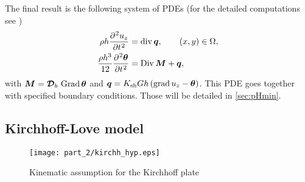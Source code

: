 The final result is the following system of PDEs (for the detailed computations see \cite[Chapter 10]{reddy2006theory})
\begin{equation}\label{eq:classMin}
\begin{aligned}
\rho h \diffp[2]{u_z}{t} &= \div \bm{q}, \qquad (x,y) \in \Omega, \\
\frac{\rho h^3}{12} \diffp[2]{\bm{\theta}}{t} &=\Div \bm{M} + \bm{q},
\end{aligned}
\end{equation}
with $\bm{M}= \bm{\mathcal{D}}_b\,\operatorname*{Grad}{\bm{\theta}}$ and $\bm{q}= K_{\text{sh}} Gh\,(\operatorname*{grad} u_z - \bm{\theta})$. This PDE goes together with specified boundary conditions. Those will be detailed in \ref{sec:pHmin}.


\subsection{Kirchhoff-Love model}
\begin{figure}[tb]
	\centering
	\texttt{[image: part\_2/kirchh\_hyp.eps]}
	\caption{Kinematic assumption for the Kirchhoff plate}
	\label{fig:kirchh_hyp}
\end{figure}

